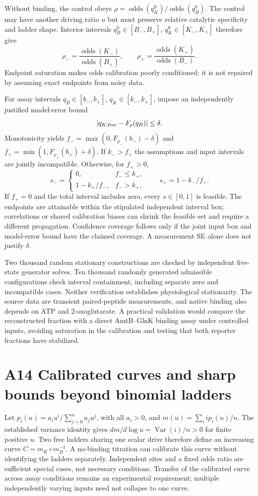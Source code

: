 \documentclass[11pt]{article}
\begin{document}
Without binding, the control obeys $\rho=\operatorname{odds}(q_K^0)/\operatorname{odds}(q_B^0)$. The control may have another driving ratio $u$ but must preserve relative catalytic specificity and ladder shape. Interior intervals $q_B^0\in[B_-,B_+]$, $q_K^0\in[K_-,K_+]$ therefore give
\[
 \rho_- =\frac{\operatorname{odds}(K_-)}{\operatorname{odds}(B_+)},\qquad
 \rho_+ =\frac{\operatorname{odds}(K_+)}{\operatorname{odds}(B_-)}.
\]
Endpoint saturation makes odds calibration poorly conditioned; it is not repaired by assuming exact endpoints from noisy data.

For assay intervals $q_B\in[b_-,b_+]$, $q_K\in[k_-,k_+]$, impose an independently justified model-error bound
\[
 |q_{K,\rm free}-F_\rho(q_B)|\leq\delta.
\]
Monotonicity yields $f_- =\max(0,F_{\rho_-}(b_-)-\delta)$ and $f_+=\min(1,F_{\rho_+}(b_+)+\delta)$. If $k_->f_+$ the assumptions and input intervals are jointly incompatible. Otherwise, for $f_+>0$,
\[
 s_-=\begin{cases}0,&f_-\leq k_+,\\1-k_+/f_-,&f_->k_+,\end{cases}
 \qquad s_+=1-k_-/f_+.
\]
If $f_+=0$ and the total interval includes zero, every $s\in[0,1]$ is feasible. The endpoints are attainable within the stipulated independent interval box; correlations or shared calibration biases can shrink the feasible set and require a different propagation. Confidence coverage follows only if the joint input box and model-error bound have the claimed coverage. A measurement SE alone does not justify $\delta$.

Two thousand random stationary constructions are checked by independent five-state generator solves. Ten thousand randomly generated admissible configurations check interval containment, including separate zero and incompatible cases. Neither verification establishes physiological stationarity. The source data are transient paired-peptide measurements, and native binding also depends on ATP and 2-oxoglutarate. A practical validation would compare the reconstructed fraction with a direct AmtB--GlnK binding assay under controlled inputs, avoiding saturation in the calibration and testing that both reporter fractions have stabilized.


\section*{A14 Calibrated curves and sharp bounds beyond binomial ladders}
Let $p_i(u)=a_i u^i/\sum_{j=0}^n a_j u^j$, with all $a_i>0$, and $m(u)=\sum_i ip_i(u)/n$. The established variance identity gives $d m/d\log u=\operatorname{Var}(i)/n>0$ for finite positive $u$. Two free ladders sharing one scalar drive therefore define an increasing curve $C=m_K\circ m_B^{-1}$. A no-binding titration can calibrate this curve without identifying the ladders separately. Independent sites and a fixed odds ratio are sufficient special cases, not necessary conditions. Transfer of the calibrated curve across assay conditions remains an experimental requirement; multiple independently varying inputs need not collapse to one curve.
\end{document}
